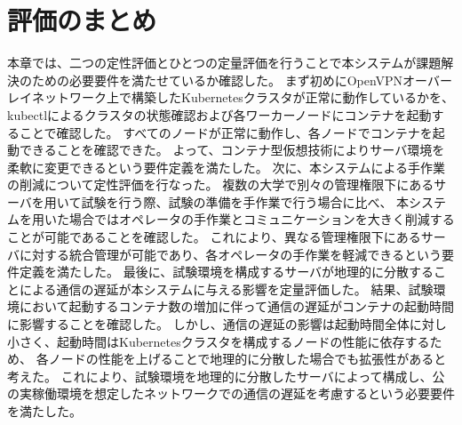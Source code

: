 \section{評価のまとめ}

本章では、二つの定性評価とひとつの定量評価を行うことで本システムが課題解決のための必要要件を満たせているか確認した。
まず初めにOpenVPNオーバーレイネットワーク上で構築したKubernetesクラスタが正常に動作しているかを、kubectlによるクラスタの状態確認および各ワーカーノードにコンテナを起動することで確認した。
すべてのノードが正常に動作し、各ノードでコンテナを起動できることを確認できた。
よって、コンテナ型仮想技術によりサーバ環境を柔軟に変更できるという要件定義を満たした。
次に、本システムによる手作業の削減について定性評価を行なった。
複数の大学で別々の管理権限下にあるサーバを用いて試験を行う際、試験の準備を手作業で行う場合に比べ、
本システムを用いた場合ではオペレータの手作業とコミュニケーションを大きく削減することが可能であることを確認した。
これにより、異なる管理権限下にあるサーバに対する統合管理が可能であり、各オペレータの手作業を軽減できるという要件定義を満たした。
最後に、試験環境を構成するサーバが地理的に分散することによる通信の遅延が本システムに与える影響を定量評価した。
結果、試験環境において起動するコンテナ数の増加に伴って通信の遅延がコンテナの起動時間に影響することを確認した。
しかし、通信の遅延の影響は起動時間全体に対し小さく、起動時間はKubernetesクラスタを構成するノードの性能に依存するため、
各ノードの性能を上げることで地理的に分散した場合でも拡張性があると考えた。
これにより、試験環境を地理的に分散したサーバによって構成し、公の実稼働環境を想定したネットワークでの通信の遅延を考慮するという必要要件を満たした。

